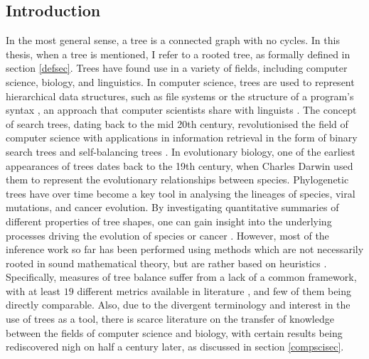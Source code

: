 \subsection{Introduction}
In the most general sense, a tree is a connected graph with no cycles. In this
thesis, when a tree is mentioned, I refer to a rooted tree, as formally defined
in section \ref{defsec}. Trees have found use in a variety of fields, including
computer science, biology, and linguistics. In computer science, trees are used
to represent hierarchical data structures, such as file systems
\cite{nievergelt_binary_1974} or the structure of a program's syntax
\cite{knuth_semantics_1968}, an approach that computer scientists share with
linguists \cite{chomsky_syntactic_1957}. The concept of search trees, dating
back to the mid 20th century, revolutionised the field of computer science with
applications in information retrieval in the form of binary search trees and
self-balancing trees \cite{nievergelt_binary_1972, knuth_art_1997}. In
evolutionary biology, one of the earliest appearances of trees dates back to
the 19th century, when Charles Darwin used them to represent the evolutionary
relationships between species. Phylogenetic trees have over time become a key
tool in analysing the lineages of species, viral mutations, and cancer
evolution. By investigating quantitative summaries of different properties of
tree shapes, one can gain insight into the underlying processes driving the
evolution of species \cite{mooers_inferring_1997} or cancer
\cite{scott_inferring_2018, noble_spatial_2022}. However, most of the inference
work so far has been performed using methods which are not necessarily rooted
in sound mathematical theory, but are rather based on heuristics
\cite{omeara_evolutionary_2012}. Specifically, measures of tree balance suffer
from a lack of a common framework, with at least $19$ different metrics
available in literature \cite{fischer_tree_2021}, and few of them being
directly comparable. Also, due to the divergent terminology and interest in the
use of trees as a tool, there is scarce literature on the transfer of knowledge
between the fields of computer science and biology, with certain results being
rediscovered nigh on half a century later, as discussed in section
\ref{compscisec}.

